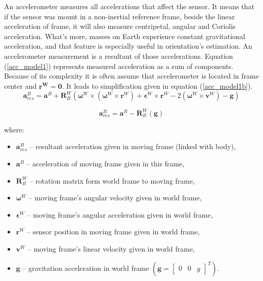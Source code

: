 An accelerometer measures all accelerations that affect the sensor. It means that if the sensor was mount in a non-inertial reference frame, beside the linear acceleration of frame, it will also measure centripetal, angular and Coriolis acceleration. What's more, masses on Earth experience constant gravitational acceleration, and that feature is especially useful in orientation's estimation. An accelerometer measurement is a resultant of those accelerations. Equation (\ref{acc_model1}) represents measured acceleration as a sum of components. Because of its complexity it is often assume that accelerometer is located in frame center and $\bm{r^W} = \bm{0}$. It leads to simplification given in equation (\ref{acc_model1b}).
\\
\begin{equation}
	\bm{a}_{res}^B = \bm{a}^B + \bm{R}^W_B \left( \bm{\omega}^W \times \left( \bm{\omega}^W \times \bm{r}^W \right) + \bm{\epsilon}^W \times \bm{r}^W - 2\left( \bm{\omega}^W \times \bm{v}^W \right) - \bm{g}  \right)  
	\label{acc_model1}
\end{equation}

\begin{equation}
	\bm{a}_{res}^B = \bm{a}^B - \bm{R}^W_B \left( \bm{g}  \right)  
	\label{acc_model1b}
\end{equation}

where:
\begin{itemize}
	\item $\bm{a}_{res}^B$ -- resultant acceleration given in moving frame (linked with body),
	\item $\bm{a}^B$ -- acceleration of moving frame given in this frame,
	\item $\bm{R}^W_B$ -- rotation matrix form world frame to moving frame,
	\item $\bm{\omega}^W$ -- moving frame's angular velocity given in world frame,
	\item $\bm{\epsilon}^W$ -- moving frame's angular acceleration given in world frame,
	\item $\bm{r}^W$ -- sensor position in moving frame given in world frame,
	\item $\bm{v}^W$ -- moving frame's linear velocity given in world frame,
	\item $\bm{g}$ -- gravitation acceleration in world frame $\left( \bm{g} = \begin{bmatrix}
		0 &  0 &  g
	\end{bmatrix}^T \right)$.
\end{itemize}

